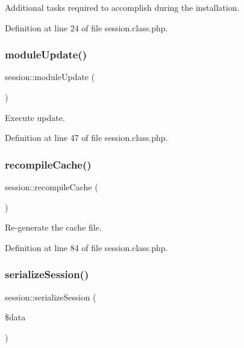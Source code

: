 Additional tasks required to accomplish during the installation. 



Definition at line 24 of file session.\+class.\+php.

\mbox{\label{classsession_ad1eb77a85d7765620658071e49d16cff}} 
\subsubsection{\texorpdfstring{module\+Update()}{moduleUpdate()}}
{\footnotesize\ttfamily session\+::module\+Update (\begin{DoxyParamCaption}{ }\end{DoxyParamCaption})}



Execute update. 



Definition at line 47 of file session.\+class.\+php.

\mbox{\label{classsession_a08f5190f8867dc2c0d5c23435b236f15}} 
\subsubsection{\texorpdfstring{recompile\+Cache()}{recompileCache()}}
{\footnotesize\ttfamily session\+::recompile\+Cache (\begin{DoxyParamCaption}{ }\end{DoxyParamCaption})}



Re-\/generate the cache file. 



Definition at line 84 of file session.\+class.\+php.

\mbox{\label{classsession_aea7dba13f8bc60c916840c66b2bc28ba}} 
\subsubsection{\texorpdfstring{serialize\+Session()}{serializeSession()}}
{\footnotesize\ttfamily session\+::serialize\+Session (\begin{DoxyParamCaption}\item[{}]{\$data }\end{DoxyParamCaption})}



